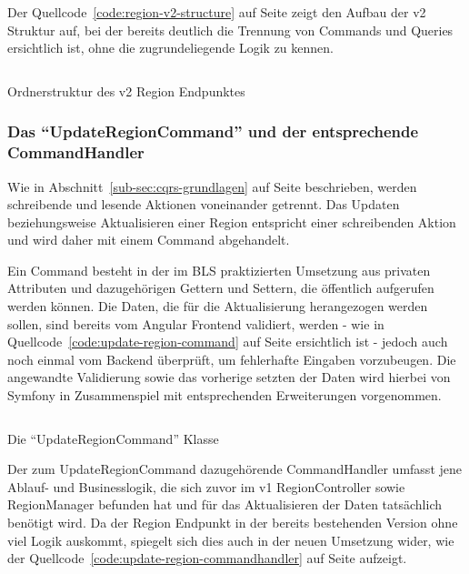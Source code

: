 \documentclass[a4paper,12pt,twoside]{scrreprt}
\begin{document}
\medskip

Der Quellcode~\ref{code:region-v2-structure} auf Seite \pageref{code:region-v2-structure} zeigt den Aufbau der v2 Struktur auf, bei der bereits deutlich die Trennung von Commands und Queries ersichtlich ist, ohne die zugrundeliegende Logik zu kennen.

\begin{listing}[ht]
    \inputminted[fontsize=\footnotesize,linenos]{text}{code/region_v2_structure.txt}
    \caption[Ordnerstruktur des v2 Region Endpunktes]{Ordnerstruktur des v2 Region Endpunktes}
    \label{code:region-v2-structure}
\end{listing}

\subsubsection{Das \enquote{UpdateRegionCommand} und der entsprechende CommandHandler}
\label{sub-sub-sec:update-region-command}
Wie in Abschnitt~\ref{sub-sec:cqrs-grundlagen} auf Seite \pageref{sub-sec:cqrs-funktionsweise} beschrieben, werden schreibende und lesende Aktionen voneinander getrennt. Das Updaten beziehungsweise Aktualisieren einer Region entspricht einer schreibenden Aktion und wird daher mit einem Command abgehandelt.

Ein Command besteht in der im BLS praktizierten Umsetzung aus privaten Attributen und dazugehörigen Gettern und Settern, die öffentlich aufgerufen werden können. Die Daten, die für die Aktualisierung herangezogen werden sollen, sind bereits vom Angular Frontend validiert, werden - wie in Quellcode~\ref{code:update-region-command} auf Seite \pageref{code:update-region-command} ersichtlich ist - jedoch auch noch einmal vom Backend überprüft, um fehlerhafte Eingaben vorzubeugen. Die angewandte Validierung sowie das vorherige setzten der Daten wird hierbei von Symfony in Zusammenspiel mit entsprechenden Erweiterungen vorgenommen.

\begin{listing}[ht]
    \inputminted[fontsize=\footnotesize,linenos,breaklines]{php}{code/update_region_command.php}
    \caption[Die \enquote{UpdateRegionCommand} Klasse]{Die \enquote{UpdateRegionCommand} Klasse}
    \label{code:update-region-command}
\end{listing}

Der zum UpdateRegionCommand dazugehörende CommandHandler umfasst jene Ablauf- und Businesslogik, die sich zuvor im v1 RegionController sowie RegionManager befunden hat und für das Aktualisieren der Daten tatsächlich benötigt wird. Da der Region Endpunkt in der bereits bestehenden Version ohne viel Logik auskommt, spiegelt sich dies auch in der neuen Umsetzung wider, wie der Quellcode~\ref{code:update-region-commandhandler} auf Seite \pageref{code:update-region-commandhandler} aufzeigt.
\end{document}
